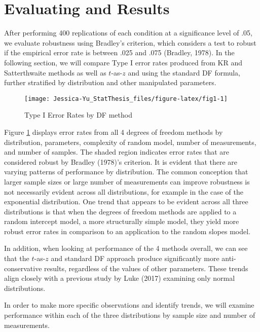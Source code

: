 \documentclass[12pt, twoside]{amherstthesis}
\begin{document}
\hypertarget{evaluating-and-results}{%
\section{Evaluating and Results}\label{evaluating-and-results}}

After performing 400 replications of each condition at a significance level of .05, we evaluate robustness using Bradley's criterion, which considers a test to robust if the empirical error rate is between .025 and .075 (Bradley, 1978). In the following section, we will compare Type I error rates produced from KR and Satterthwaite methods as well as \(t\)-as-\(z\) and using the standard DF formula, further stratified by distribution and other manipulated parameters.
\begin{figure}

{\centering \texttt{[image: Jessica-Yu\_StatThesis\_files/figure-latex/fig1-1]} 

}

\caption{Type I Error Rates by DF method}\label{fig:fig1}
\end{figure}
Figure \ref{fig:fig1} displays error rates from all 4 degrees of freedom methods by distribution, parameters, complexity of random model, number of measurements, and number of samples. The shaded region indicates error rates that are considered robust by Bradley (1978)'s criterion. It is evident that there are varying patterns of performance by distribution. The common conception that larger sample sizes or large number of measurements can improve robustness is not necessarily evident across all distributions, for example in the case of the exponential distribution. One trend that appears to be evident across all three distributions is that when the degrees of freedom methods are applied to a random intercept model, a more structurally simple model, they yield more robust error rates in comparison to an application to the random slopes model.

In addition, when looking at performance of the 4 methods overall, we can see that the \(t\)-as-\(z\) and standard DF approach produce significantly more anti-conservative results, regardless of the values of other parameters. These trends align closely with a previous study by Luke (2017) examining only normal distributions.

In order to make more specific observations and identify trends, we will examine performance within each of the three distributions by sample size and number of measurements.
\end{document}
